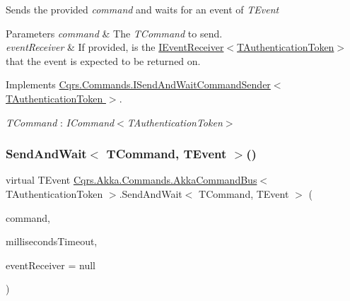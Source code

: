 Sends the provided {\itshape command}  and waits for an event of {\itshape T\+Event}  


\begin{DoxyParams}{Parameters}
{\em command} & The {\itshape T\+Command}  to send.\\
\hline
{\em event\+Receiver} & If provided, is the \hyperlink{interfaceCqrs_1_1Events_1_1IEventReceiver}{I\+Event\+Receiver$<$\+T\+Authentication\+Token$>$} that the event is expected to be returned on.\\
\hline
\end{DoxyParams}


Implements \hyperlink{interfaceCqrs_1_1Commands_1_1ISendAndWaitCommandSender_ab64dd5144f0688b0e23ffe289d4ffa2e}{Cqrs.\+Commands.\+I\+Send\+And\+Wait\+Command\+Sender$<$ T\+Authentication\+Token $>$}.

\begin{Desc}
\item[Type Constraints]\begin{description}
\item[{\em T\+Command} : {\em I\+Command$<$T\+Authentication\+Token$>$}]\end{description}
\end{Desc}
\mbox{\label{classCqrs_1_1Akka_1_1Commands_1_1AkkaCommandBus_a4f96fc98615afb9af8fe4d54a398660a}} 
\subsubsection{\texorpdfstring{Send\+And\+Wait$<$ T\+Command, T\+Event $>$()}{SendAndWait< TCommand, TEvent >()}\hspace{0.1cm}{\footnotesize\ttfamily [2/6]}}
{\footnotesize\ttfamily virtual T\+Event \hyperlink{classCqrs_1_1Akka_1_1Commands_1_1AkkaCommandBus}{Cqrs.\+Akka.\+Commands.\+Akka\+Command\+Bus}$<$ T\+Authentication\+Token $>$.Send\+And\+Wait$<$ T\+Command, T\+Event $>$ (\begin{DoxyParamCaption}\item[{T\+Command}]{command,  }\item[{int}]{milliseconds\+Timeout,  }\item[{\hyperlink{interfaceCqrs_1_1Events_1_1IEventReceiver}{I\+Event\+Receiver}$<$ T\+Authentication\+Token $>$}]{event\+Receiver = {\ttfamily null} }\end{DoxyParamCaption})\hspace{0.3cm}{\ttfamily [virtual]}}



